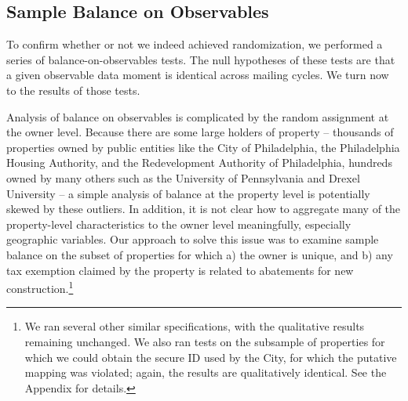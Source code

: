 \documentclass[12pt,titlepage]{article}
\begin{document}
\subsection{Sample Balance on Observables}

To confirm whether or not we indeed achieved randomization, we
performed a series of balance-on-observables tests. The null
hypotheses of these tests are that a given observable data moment is
identical across mailing cycles. We turn now to the results of those
tests.

Analysis of balance on observables is complicated by the random
assignment at the owner level.  Because there are some large holders
of property -- thousands of properties owned by public entities like
the City of Philadelphia, the Philadelphia Housing Authority, and the
Redevelopment Authority of Philadelphia, hundreds owned by many others
such as the University of Pennsylvania and Drexel University -- a
simple analysis of balance at the property level is potentially skewed
by these outliers. In addition, it is not clear how to aggregate many
of the property-level characteristics to the owner level meaningfully,
especially geographic variables. Our approach to solve this issue was
to examine sample balance on the subset of properties for which a) the
owner is unique, and b) any tax exemption claimed by the property is
related to abatements for new construction.\footnote{We ran several
  other similar specifications, with the qualitative results remaining
  unchanged. We also ran tests on the subsample of properties for
  which we could obtain the secure ID used by the City, for which the
  putative mapping was violated; again, the results are qualitatively
  identical. See the Appendix for details.}
\end{document}
